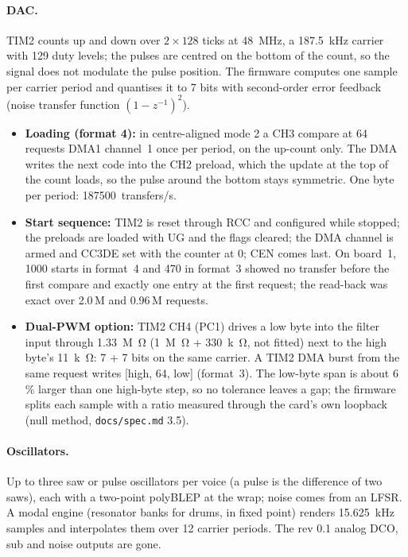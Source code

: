 \documentclass[11pt,a4paper]{article}
\newcommand{\file}[1]{\texttt{#1}}
\begin{document}
\paragraph{DAC.} TIM2 counts up and down over $2\times128$ ticks at \SI{48}{MHz}, a \SI{187.5}{kHz} carrier with
129 duty levels; the pulses are centred on the bottom of the count, so the signal does not modulate the pulse
position. The firmware computes one sample per carrier period and quantises it to 7 bits with second-order error
feedback (noise transfer function $(1-z^{-1})^2$).
\begin{itemize}
  \item \textbf{Loading (format 4):} in centre-aligned mode 2 a CH3 compare at 64 requests DMA1 channel~1 once per
    period, on the up-count only. The DMA writes the next code into the CH2 preload, which the update at the top of the
    count loads, so the pulse around the bottom stays symmetric. One byte per period: \SI{187500}{transfers/s}.
  \item \textbf{Start sequence:} TIM2 is reset through RCC and configured while stopped; the preloads are loaded with
    UG and the flags cleared; the DMA channel is armed and CC3DE set with the counter at 0; CEN comes last. On board~1,
    1000 starts in format~4 and 470 in format~3 showed no transfer before the first compare and exactly one entry at
    the first request; the read-back was exact over 2.0\,M and 0.96\,M requests.
  \item \textbf{Dual-PWM option:} TIM2 CH4 (PC1) drives a low byte into the filter input through
    \SI{1.33}{M\ohm} (\SI{1}{M\ohm} + \SI{330}{k\ohm}, not fitted) next to the high byte's \SI{11}{k\ohm}: 7 + 7 bits on
    the same carrier. A TIM2 DMA burst from the same request writes [high, 64, low] (format~3). The low-byte span is
    about 6\,\% larger than one high-byte step, so no tolerance leaves a gap; the firmware splits each sample with a
    ratio measured through the card's own loopback (null method, \file{docs/spec.md} 3.5).
\end{itemize}

\paragraph{Oscillators.} Up to three saw or pulse oscillators per voice (a pulse is the difference of two saws), each
with a two-point polyBLEP at the wrap; noise comes from an LFSR. A modal engine (resonator banks for drums, in fixed
point) renders \SI{15.625}{kHz} samples and interpolates them over 12 carrier periods. The rev 0.1 analog DCO, sub and
noise outputs are gone.
\end{document}
